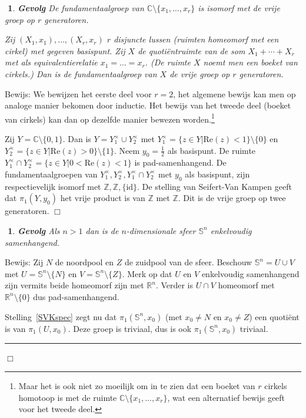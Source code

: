 \documentclass[12pt]{book}
\newcommand{\R}{\mathbb{R}}
\newcommand{\Z}{\mathbb{Z}}
\newcommand{\bew}{{\sc Bewijs: }}
\newcommand{\B}{\rule{1mm}{0mm} \hfill $\Box$ }
\newcommand{\id}{\mbox{id}}
\newcommand{\C}{\mathbb{C}}
\newtheorem{gevh}[stelh]{$\!\!$}
\newenvironment{gev}{\begin{gevh}{\em {\bf Gevolg }}}{\end{gevh}}
\begin{document}
\begin{gev}\label{boeket}
De fundamentaalgroep van $\C\setminus\{x_1,\ldots , x_r\}$ is isomorf met de vrije groep op
$r$ generatoren.

Zij $(X_1,x_1), \ldots, (X_r,x_r)$ $r$ disjuncte lussen (ruimten homeomorf met een cirkel) met
gegeven basispunt. Zij $X$ de quoti\"entruimte van de som $X_1 +\cdots +X_r$
met als equivalentierelatie $x_1=\ldots =x_r$. (De ruimte $X$ noemt men een {\em boeket van cirkels}.) Dan
is de fundamentaalgroep van $X$ de vrije groep op $r$ generatoren.
\end{gev}

\bew We bewijzen het eerste deel voor $r=2$, het algemene bewijs kan men op analoge manier bekomen
door inductie. Het bewijs van het tweede deel (boeket van cirkels) kan  dan op dezelfde manier bewezen worden.\footnote{Maar het
is ook niet zo moeilijk om in te zien dat een boeket van $r$ cirkels homotoop is met de ruimte
$\C\setminus\{x_1,\ldots , x_r\}$, wat een alternatief bewijs geeft voor het tweede deel.}

Zij $Y=\C\setminus\{0,1\}$. Dan is $Y=Y_1^\times \cup Y_2^\times$ met $Y_1^\times=\{z\in Y|\mbox{Re}(z)<1\} \setminus \{0\}$ en
$Y_2^{\times}=\{z\in Y|\mbox{Re}(z)>0\} \setminus \{1\}$. Neem $y_0=\frac{1}{2}$ als basispunt. 
De ruimte $Y_1^{\times}\cap Y_2^{\times}=\{z\in Y|0<\mbox{Re}(z)<1\}$ is pad-samenhangend.
De fundamentaalgroepen van $Y_1^\times,
Y_2^\times, Y_1^\times\cap Y_2^\times$ met $y_0$ als basispunt, zijn respectievelijk isomorf met $\Z, \Z, \{\id\}$. De
stelling van Seifert-Van Kampen geeft dat $\pi_{1}(Y,y_0)$ het vrije product is van $\Z$ met $\Z$.
Dit is de vrije groep op twee generatoren. \hfill $\Box$ \\

\begin{gev}
Als $n> 1$ dan is de $n$-dimensionale sfeer $\mathbb{S}^n$ enkelvoudig samenhangend.
\end{gev}
\bew Zij $N$ de noordpool en $Z$ de zuidpool van de sfeer. Beschouw $\mathbb{S}^n=U\cup V$ met
$U=\mathbb{S}^n\setminus \{N\}$ en $V=\mathbb{S}^n\setminus \{Z\}$. Merk op dat $U$ en $V$ enkelvoudig samenhangend
zijn vermits beide homeomorf zijn met $\R^n$. Verder is $U\cap V$ homeomorf met
$\R^n\setminus\{0\}$ dus pad-samenhangend.

Stelling~\ref{SVKspec} zegt nu dat $\pi_{1}(\mathbb{S}^n, x_0)$ (met $x_0\not=N$ en $x_0\not=Z$) een
quoti\"ent is van $\pi_{1}(U,x_0)$. Deze groep is triviaal, dus is ook $\pi_{1}(\mathbb{S}^n, x_0)$ triviaal.
\B
\end{document}
